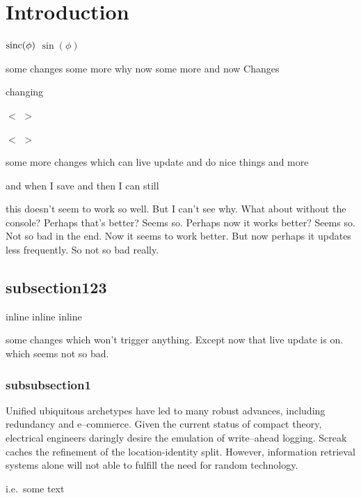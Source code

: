 
\section{Introduction}
\label{sec:intro}

${\rm sinc}(\phi)$ 
$\sin(\phi)$  

some changes some more why now some more and now
Changes

changing

$<$ $>$


$<$ $>$


some more changes which can live update and do nice things and more

and when I save and  then I can still  

this doesn't seem to work so well. But I can't see why. What about without the
console? Perhaps that's better? Seems so. Perhaps now it works better? Seems so.
Not so bad in the end. Now it seems to work better. But now perhaps it updates
less frequently. So not so bad really.


\subsection*{subsection123}
  
inline %
inline %
inline %

some changes which won't trigger anything. Except now that live update is on.
which seems not so bad.



\subsubsection*{subsubsection1}

Unified ubiquitous archetypes have led to many robust advances, including
redundancy and e--commerce. Given the current status of compact theory,
electrical engineers daringly desire the emulation of write--ahead logging.
Screak caches the refinement of the location-identity split. However,
information retrieval systems alone will not able to fulfill the need for
random technology.


i.e.\ some text


